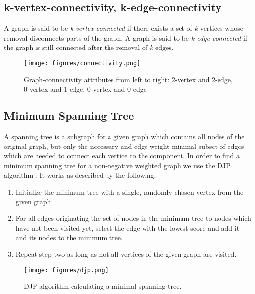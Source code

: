   \subsection{k-vertex-connectivity, k-edge-connectivity}
    A graph is said to be \textit{k-vertex-connected} if there exists a set of \textit{k} vertices whose removal disconnects parts of the graph.\newline
    A graph is said to be \textit{k-edge-connected} if the graph is still connected after the removal of \textit{k} edges.
    \begin{figure}[th!]
      \centering
      \texttt{[image: figures/connectivity.png]}
      \caption{Graph-connectivity attributes from left to right: 2-vertex and 2-edge, 0-vertex and 1-edge, 0-vertex and 0-edge}
      \label{fig:connectivity}
    \end{figure}
    
  \subsection{Minimum Spanning Tree}
    A spanning tree is a subgraph for a given graph which contains all nodes of the original graph, but only the necessary and edge-weight minimal 
    subset of edges which are needed to connect each vertice to the component. In order to find a minimum spanning tree for a non-negative weighted 
    graph we use the \ac{DJP} algorithm \cite{prim} \cite{jarnik}. It works as described by the following:
    
    \begin{enumerate}
     \item Initialize the minimum tree with a single, randomly chosen vertex from the given graph.
     
     \item For all edges originating the set of nodes in the minimum tree to nodes which have not been visited yet, 
      select the edge with the lowest score and add it and its nodes to the minimum tree.
      
     \item Repeat step two as long as not all vertices of the given graph are visited.
    \end{enumerate}
    
    \begin{figure}[th!]
      \centering
      \texttt{[image: figures/djp.png]}
      \caption{\ac{DJP} algorithm calculating a minimal spanning tree.}
      \label{fig:djp}
    \end{figure}
    
